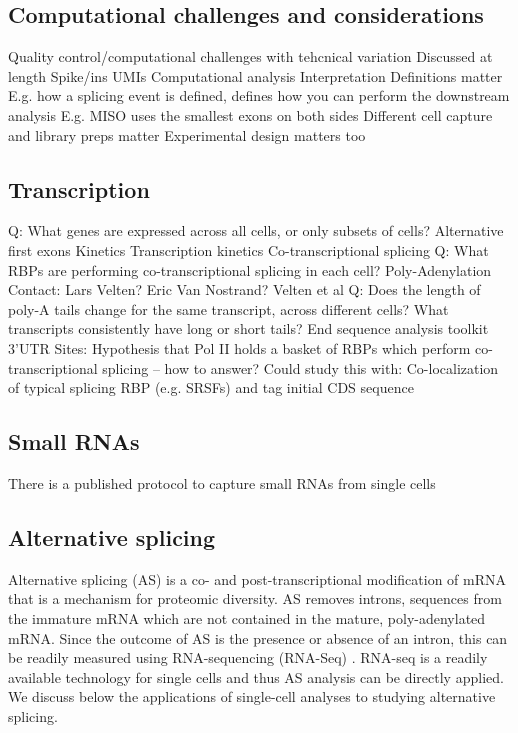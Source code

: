 \subsection{Computational challenges and considerations}
Quality control/computational challenges with tehcnical variation
Discussed at length \cite{Stegle:2015cx}
Spike/ins UMIs \cite{Kivioja2011-dp}
Computational analysis
Interpretation
Definitions matter
E.g. how a splicing event is defined, defines how you can perform the downstream analysis
E.g. MISO uses the smallest exons on both sides
Different cell capture and library preps matter \cite{Ziegenhain:2017kr}
Experimental design matters too \cite{Bacher2016-ze}

\subsection{Transcription}
Q: What genes are expressed across all cells, or only subsets of cells?
Alternative first exons
Kinetics
Transcription kinetics \cite{Livak2013-nv}
Co-transcriptional splicing
Q: What RBPs are performing co-transcriptional splicing in each cell?
Poly-Adenylation
Contact: Lars Velten? Eric Van Nostrand?
Velten et al \cite{Velten:2015ie}
Q: Does the length of poly-A tails change for the same transcript, across different cells? What transcripts consistently have long or short tails?
End sequence analysis toolkit \cite{Derr:2016gk}
3'UTR Sites: \cite{Dueck:2015hd}
Hypothesis that Pol II holds a basket of RBPs which perform co-transcriptional splicing -- how to answer?
Could study this with: Co-localization of typical splicing RBP (e.g. SRSFs) and tag initial CDS sequence 


\subsection{Small RNAs}
There is a published protocol to capture small RNAs from single cells \cite{Faridani2016-de}

\subsection{Alternative splicing}
Alternative splicing (AS) is a co- and post-transcriptional modification of mRNA \cite{Ameur2011-wf,Caceres2002-el} that is a mechanism for proteomic diversity. AS removes introns, sequences from the immature mRNA which are not contained in the mature, poly-adenylated mRNA. Since the outcome of AS is the presence or absence of an intron, this can be readily measured using RNA-sequencing (RNA-Seq) \cite{Wang:2008gt}. RNA-seq is a readily available technology for single cells and thus AS analysis can be directly applied. We discuss below the applications of single-cell analyses to studying alternative splicing.

